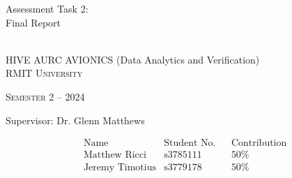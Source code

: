 \documentclass[a4paper, oneside]{memoir}
\numberwithin{figure}{section}
\newcommand*{\semester}[2]{Semester #1 -- #2} %
\newcommand*{\student}[3]{&\text{#1} &\text{#2} &&\text{#3}} %
\newcommand*{\titleAM}[4]%
{\begingroup
  \centering
  {\Huge Assessment Task #2:\\#3\par}\\[\baselineskip]
  {\Large HIVE AURC AVIONICS (Data Analytics and Verification)}\\[\baselineskip]
  {\small\scshape RMIT University}\par
  {\small\scshape #4}\par\vspace{0.5em}
  {\large Supervisor: #1}\par\vspace{0.5em}
  \endgroup}
\begin{document}
  \titleAM{Dr. Glenn Matthews}{2}{Final Report}{\semester{2}{2024}}
  \begin{align*}
    &\text{Name} &\text{Student No.} &&\text{Contribution}\\
    \student{Matthew Ricci}{s3785111}{50\%}\\
    \student{Jeremy Timotius}{s3779178}{50\%}
  \end{align*}

  \clearpage
  \noindent{}
  \vspace{2.5em}
  \tableofcontents*
  \listofequations
  \vfill
  \noindent{}
  \thispagestyle{empty}
  \clearpage

  \markboth{}{}
  

  \printbibliography[title=References]

  \clearpage
  
\end{document}
